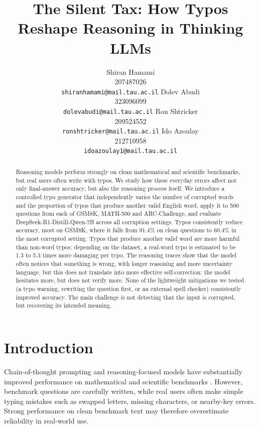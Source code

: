 \documentclass[11pt]{article}
\title{The Silent Tax: How Typos Reshape Reasoning in Thinking LLMs}
\author{
Shiran Hamami \\ 207487026 \\ \texttt{shiranhamami@mail.tau.ac.il} \And
Dolev Abudi \\ 323096099 \\ \texttt{dolevabudi@mail.tau.ac.il} \AND
Ron Shtricker \\ 209524552 \\ \texttt{ronshtricker@mail.tau.ac.il} \And
Ido Azoulay \\ 212710958 \\ \texttt{idoazoulay1@mail.tau.ac.il}
}
\begin{document}
\maketitle

\begin{abstract}
Reasoning models perform strongly on clean mathematical and scientific
benchmarks, but real users often write with typos. We study how these everyday
errors affect not only final-answer accuracy, but also the reasoning process
itself. We introduce a controlled typo generator that independently varies the
number of corrupted words and the proportion of typos that produce another
valid English word, apply it to 500 questions from each of GSM8K, MATH-500 and
ARC-Challenge, and evaluate DeepSeek-R1-Distill-Qwen-7B across all corruption
settings. Typos consistently reduce accuracy, most on GSM8K, where it falls from
91.4\% on clean questions to 60.4\% in the most corrupted setting. Typos that
produce another valid word are more harmful than non-word typos: depending on
the dataset, a real-word typo is estimated to be 1.3 to 5.3 times more damaging
per typo. The reasoning traces show that the model often notices that something
is wrong, with longer reasoning and more uncertainty language, but this does not
translate into more effective self-correction: the model hesitates more, but
does not verify more. None of the lightweight mitigations we tested (a typo
warning, rewriting the question first, or an external spell checker)
consistently improved accuracy. The main challenge is not detecting that the
input is corrupted, but recovering its intended meaning.
\end{abstract}

\section{Introduction}

Chain-of-thought prompting and reasoning-focused models have substantially
improved performance on mathematical and scientific benchmarks
\citep{wei2022,deepseekr1}. However, benchmark questions are carefully written,
while real users often make simple typing mistakes such as swapped letters,
missing characters, or nearby-key errors. Strong performance on clean benchmark
text may therefore overestimate reliability in real-world use.
\end{document}
